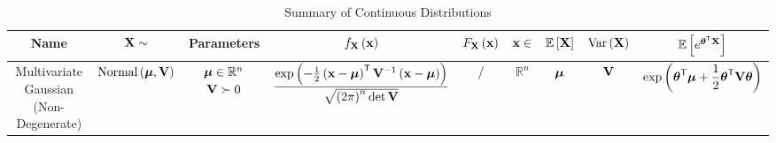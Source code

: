 \documentclass{article}
\theoremstyle{definition}
\theoremstyle{remark}
\newcommand{\RR}{\mathbb{R}}
\newcommand{\Expt}{\mathbb{E}}
\newcommand{\inverse}{^{-1}}
\newcommand{\transpose}{^{\mathsf{T}}}
\newcommand{\posDef}{\succ}
\newcommand{\Var}{\operatorname{Var}}
\newcommand{\Normal}{\operatorname{Normal}}
\begin{document}
\begin{landscape}
\begin{table}[ht!]
\begin{tabular}{c|cc|ccc|cc|c}
        \hline \hline
        \textbf{Name} & \(\vb{X} \sim\) & \textbf{Parameters} & \(f_{\vb{X}} \pqty{\vb{x}}\) & \(F_{\vb{X}} \pqty{\vb{x}}\) & \(\vb{x} \in\) & \(\Expt\bqty{\vb{X}}\) & \(\Var\pqty{\vb{X}}\) & \(\Expt\bqty{e^{\vb*{\theta}\transpose \vb{X}}}\)\\
        \hline \hline
        \makecell{Multivariate \\ Gaussian \\ (Non-Degenerate)} & \(\Normal\pqty{\vb*{\mu}, \vb{V}}\) & \makecell{\(\vb*{\mu} \in \RR^n\) \\ \(\vb{V} \posDef 0\)} & \(\displaystyle \frac{\exp\pqty{- \frac{1}{2} \pqty{\vb{x} - \vb*{\mu}}\transpose \vb{V}\inverse \pqty{\vb{x} - \vb*{\mu}}}}{\sqrt{\pqty{2\pi}^n \det \vb{V}}}\) & / & \(\RR^n\) & \(\vb*{\mu}\) & \(\vb{V}\) & \(\dsty \exp\pqty{\vb*{\theta}\transpose \vb*{\mu} + \frac{1}{2} \vb*{\theta}\transpose \vb{V} \vb*{\theta}}\) 
    \end{tabular}
    \caption{Summary of Continuous Distributions}
    \label{tab:summary-continuous-distribution}%
\end{table}
\end{landscape}
\end{document}
